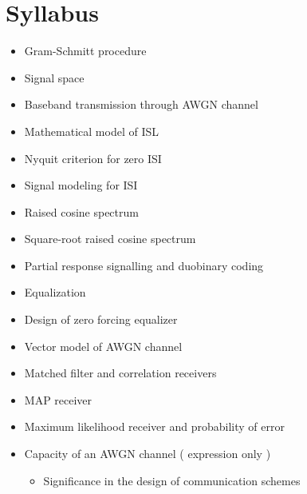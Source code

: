 \documentclass[../course]{subfiles}
\begin{document}
\section{Syllabus}

\begin{itemize}

    \item Gram-Schmitt procedure
    \item Signal space
    \item Baseband transmission through AWGN channel
    \item Mathematical model of ISL
    \item Nyquit criterion for zero ISI
    \item Signal modeling for ISI
    \item Raised cosine spectrum
    \item Square-root raised cosine spectrum
    \item Partial response signalling and duobinary coding
    \item Equalization
    \item Design of zero forcing equalizer
    \item Vector model of AWGN channel
    \item Matched filter and correlation receivers
    \item MAP receiver
    \item Maximum likelihood receiver and probability of error
    \item Capacity of an AWGN channel ( expression only )

        \begin{itemize}
            \item Significance in the design of communication schemes
        \end{itemize}

\end{itemize}
\end{document}
